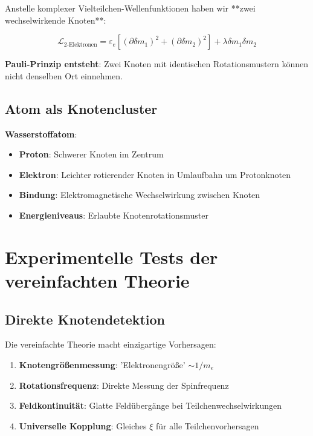 \documentclass[12pt,a4paper]{article}
\newcommand{\Lag}{\mathcal{L}}
\newcommand{\deltam}{\delta m}
\newcommand{\xipar}{\xi}
\theoremstyle{definition}
\theoremstyle{remark}
\begin{document}
	Anstelle komplexer Vielteilchen-Wellenfunktionen haben wir **zwei wechselwirkende Knoten**:
	
	\begin{equation}
		\Lag_{\text{2-Elektronen}} = \varepsilon_e [(\partial \deltam_1)^2 + (\partial \deltam_2)^2] + \lambda \deltam_1 \deltam_2
		\label{eq:two_electron}
	\end{equation}
	
	\textbf{Pauli-Prinzip entsteht}: Zwei Knoten mit identischen Rotationsmustern können nicht denselben Ort einnehmen.
	
	\subsection{Atom als Knotencluster}
	
	\textbf{Wasserstoffatom}: 
	\begin{itemize}
		\item \textbf{Proton}: Schwerer Knoten im Zentrum
		\item \textbf{Elektron}: Leichter rotierender Knoten in Umlaufbahn um Protonknoten
		\item \textbf{Bindung}: Elektromagnetische Wechselwirkung zwischen Knoten
		\item \textbf{Energieniveaus}: Erlaubte Knotenrotationsmuster
	\end{itemize}
	
	\section{Experimentelle Tests der vereinfachten Theorie}
	
	\subsection{Direkte Knotendetektion}
	
	Die vereinfachte Theorie macht einzigartige Vorhersagen:
	
	\begin{enumerate}
		\item \textbf{Knotengrößenmessung}: 'Elektronengröße' $\sim 1/m_e$
		\item \textbf{Rotationsfrequenz}: Direkte Messung der Spinfrequenz
		\item \textbf{Feldkontinuität}: Glatte Feldübergänge bei Teilchenwechselwirkungen
		\item \textbf{Universelle Kopplung}: Gleiches $\xipar$ für alle Teilchenvorhersagen
	\end{enumerate}
	
\end{document}
